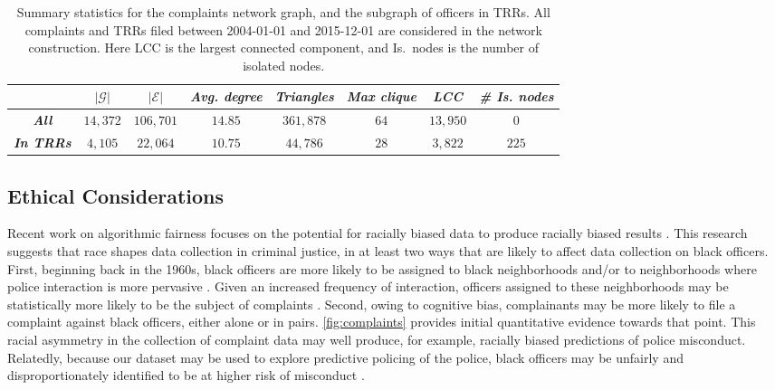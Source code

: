 \begin{table}[t!]
\caption{Summary statistics for the complaints network graph, and the subgraph
of officers in TRRs. All complaints and TRRs filed between 
2004-01-01 and 2015-12-01 are considered in the network construction.
Here LCC is the largest connected component, and Is.~nodes is 
the number of isolated nodes. 
}\label{tab:network}
\begin{tabular}{c|c|c|c|c|c|c|c|}
\cline{2-8}
                                                & $|\mathcal{G}|$ & $|\mathcal{E}|$ & \textit{Avg. degree} & \textit{Triangles} & \textit{Max clique} & \textit{LCC} & \textit{\# Is. nodes} \\ \hline
\multicolumn{1}{|c|}{\textit{\textbf{All}}}     & $14{,}372$      & $106{,}701$     & $14.85$              & $361{,}878$        & $64$                & $13{,}950$   & $0$                   \\ \hline
\multicolumn{1}{|c|}{\textit{\textbf{In TRRs}}} & $4{,}105$       & $22{,}064$      & $10.75$              & $44{,}786$         & $28$                & $3{,}822$    & $225$                 \\ \hline
\end{tabular} \label{tab:stats_graphs}
\end{table}

\subsection{Ethical Considerations}
Recent work on algorithmic fairness focuses on the potential for racially
biased data to produce racially biased results
\cite{veale2018fairness,sloane2019ai,d2020fairness}.  This research suggests
that race shapes data collection in criminal justice, in at least two ways that
are likely to affect data collection on black officers. First, beginning back
in the 1960s, black officers are more likely to be assigned to black
neighborhoods and/or to neighborhoods where police interaction is more
pervasive \cite{Kuykendall80}. Given an increased frequency of interaction,
officers assigned to these neighborhoods may be statistically more likely to be
the subject of complaints \cite{Kane06}.  Second, owing to cognitive bias, complainants 
may be more likely to file a complaint against black officers, either alone or in pairs.
\cref{fig:complaints} provides initial quantitative evidence towards that point. This racial
asymmetry in the collection of complaint data may well produce, for example,
racially biased predictions of police misconduct. Relatedly, because our
dataset may be used to explore predictive policing of the police, black
officers may be unfairly and disproportionately identified to be at higher risk
of misconduct \cite{veale2018fairness,sloane2019ai,d2020fairness,Wood19}. 

